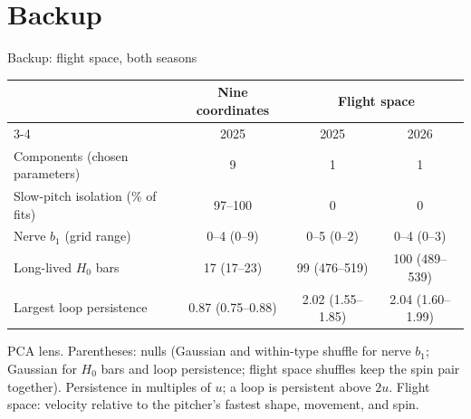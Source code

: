 \documentclass[aspectratio=169]{beamer}
\begin{document}
\section*{Backup}
\begin{frame}{Backup: flight space, both seasons}
\centering\footnotesize
\begin{tabular}{@{}lccc@{}}
\toprule
 & Nine coordinates & \multicolumn{2}{c}{Flight space} \\
\cmidrule(lr){3-4}
 & 2025 & 2025 & 2026 \\
\midrule
Components (chosen parameters) & 9 & 1 & 1 \\
Slow-pitch isolation (\% of fits) & 97--100 & 0 & 0 \\
Nerve $b_1$ (grid range) & 0--4 (0--9) & 0--5 (0--2) & 0--4 (0--3) \\
Long-lived $H_0$ bars & 17 (17--23) & 99 (476--519) & 100 (489--539) \\
Largest loop persistence & 0.87 (0.75--0.88) & 2.02 (1.55--1.85) & 2.04 (1.60--1.99) \\
\bottomrule
\end{tabular}
\par\vspace{6pt}\raggedright\scriptsize
PCA lens. Parentheses: nulls (Gaussian and within-type shuffle for nerve $b_1$; Gaussian for $H_0$ bars and loop persistence; flight space shuffles keep the spin pair together). Persistence in multiples of $u$; a loop is persistent above $2u$. Flight space: velocity relative to the pitcher's fastest shape, movement, and spin.
\end{frame}
\end{document}
